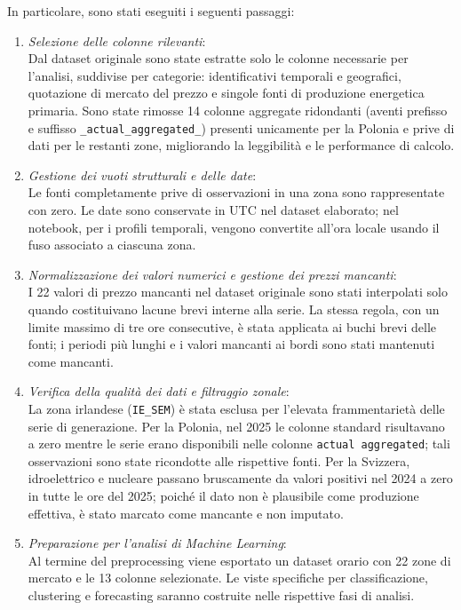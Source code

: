 In particolare, sono stati eseguiti i seguenti passaggi:

\begin{enumerate}
    \item \textit{Selezione delle colonne rilevanti}:\\
    Dal dataset originale sono state estratte solo le colonne necessarie per l'analisi, suddivise per categorie: identificativi temporali e geografici, quotazione di mercato del prezzo e singole fonti di produzione energetica primaria. Sono state rimosse 14 colonne aggregate ridondanti (aventi prefisso e suffisso \texttt{\_actual\_aggregated\_}) presenti unicamente per la Polonia e prive di dati per le restanti zone, migliorando la leggibilità e le performance di calcolo.
    
    \item \textit{Gestione dei vuoti strutturali e delle date}:\\
    Le fonti completamente prive di osservazioni in una zona sono rappresentate con zero. Le date sono conservate in UTC nel dataset elaborato; nel notebook, per i profili temporali, vengono convertite all'ora locale usando il fuso associato a ciascuna zona.
    \item \textit{Normalizzazione dei valori numerici e gestione dei prezzi mancanti}:\\
    I 22 valori di prezzo mancanti nel dataset originale sono stati interpolati solo quando costituivano lacune brevi interne alla serie. La stessa regola, con un limite massimo di tre ore consecutive, è stata applicata ai buchi brevi delle fonti; i periodi più lunghi e i valori mancanti ai bordi sono stati mantenuti come mancanti.
    
    \item \textit{Verifica della qualità dei dati e filtraggio zonale}:\\
    La zona irlandese (\texttt{IE\_SEM}) è stata esclusa per l'elevata frammentarietà delle serie di generazione. Per la Polonia, nel 2025 le colonne standard risultavano a zero mentre le serie erano disponibili nelle colonne \texttt{actual aggregated}; tali osservazioni sono state ricondotte alle rispettive fonti. Per la Svizzera, idroelettrico e nucleare passano bruscamente da valori positivi nel 2024 a zero in tutte le ore del 2025; poiché il dato non è plausibile come produzione effettiva, è stato marcato come mancante e non imputato.
    
    \item \textit{Preparazione per l'analisi di Machine Learning}:\\
    Al termine del preprocessing viene esportato un dataset orario con 22 zone di mercato e le 13 colonne selezionate. Le viste specifiche per classificazione, clustering e forecasting saranno costruite nelle rispettive fasi di analisi.
\end{enumerate}

